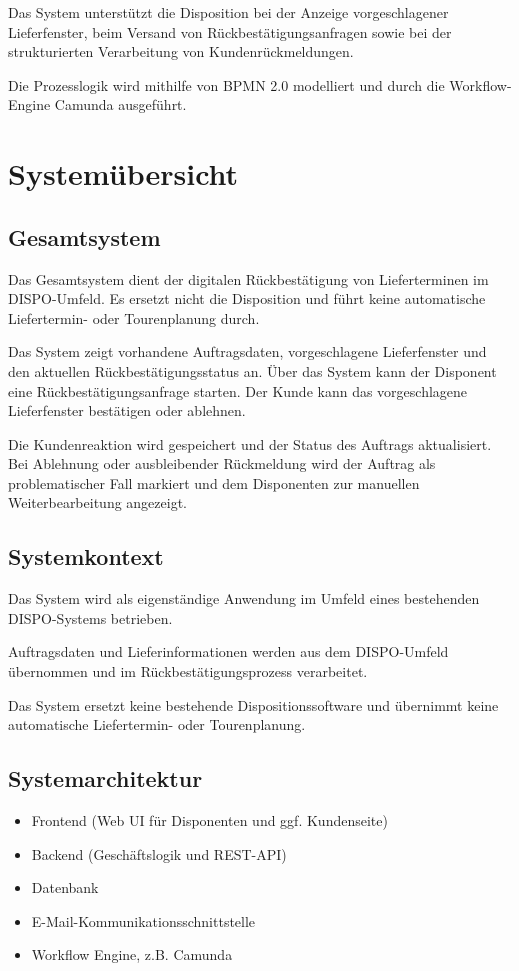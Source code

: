 \documentclass[12pt,a4paper]{article}
\begin{document}
Das System unterstützt die Disposition bei der Anzeige vorgeschlagener Lieferfenster, beim Versand von Rückbestätigungsanfragen sowie bei der strukturierten Verarbeitung von Kundenrückmeldungen.

Die Prozesslogik wird mithilfe von BPMN 2.0 modelliert und durch die Workflow-Engine Camunda ausgeführt.

\section{Systemübersicht}
\subsection{Gesamtsystem}

Das Gesamtsystem dient der digitalen Rückbestätigung von Lieferterminen im DISPO-Umfeld. 
Es ersetzt nicht die Disposition und führt keine automatische Liefertermin- oder Tourenplanung durch.

Das System zeigt vorhandene Auftragsdaten, vorgeschlagene Lieferfenster und den aktuellen Rückbestätigungsstatus an. 
Über das System kann der Disponent eine Rückbestätigungsanfrage starten. 
Der Kunde kann das vorgeschlagene Lieferfenster bestätigen oder ablehnen.

Die Kundenreaktion wird gespeichert und der Status des Auftrags aktualisiert. 
Bei Ablehnung oder ausbleibender Rückmeldung wird der Auftrag als problematischer Fall markiert und dem Disponenten zur manuellen Weiterbearbeitung angezeigt.

\subsection{Systemkontext}

Das System wird als eigenständige Anwendung im Umfeld eines bestehenden DISPO-Systems betrieben.

Auftragsdaten und Lieferinformationen werden aus dem DISPO-Umfeld übernommen und im Rückbestätigungsprozess verarbeitet.

Das System ersetzt keine bestehende Dispositionssoftware und übernimmt keine automatische Liefertermin- oder Tourenplanung.

\subsection{Systemarchitektur}
\begin{itemize}
    \item Frontend (Web UI für Disponenten und ggf. Kundenseite)
    \item Backend (Geschäftslogik und REST-API)
    \item Datenbank
    \item E-Mail-Kommunikationsschnittstelle
    \item Workflow Engine, z.B. Camunda
\end{itemize}
\end{document}
